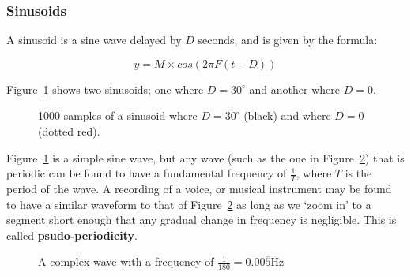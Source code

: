 \subsubsection{Sinusoids}

A sinusoid is a sine wave delayed by $D$ seconds, and is given by the formula:

\[
  y = M \times cos(2\pi F (t - D))
\]

Figure~\ref{fig-sinusoid} shows two sinusoids; one where $D = 30^{\circ}$ and
another where $D = 0$.

\begin{figure}
  \centering
  \label{fig-sinusoid}
  \caption{1000 samples of a sinusoid where $D = 30^{\circ}$ (black) and where
  $D = 0$ (dotted red).}
\end{figure} 

Figure~\ref{fig-sinusoid} is a simple sine wave, but any wave (such as the one
in Figure~\ref{fig-complex-wave}) that is periodic can be found to have a
fundamental frequency of $\frac{1}{T}$, where $T$ is the period of the wave. A
recording of a voice, or musical instrument may be found to have a similar
waveform to that of Figure~\ref{fig-complex-wave} as long as we `zoom in' to a
segment short enough that any gradual change in frequency is negligible. This is
called \textbf{psudo-periodicity}.

\begin{figure}
  \centering
  \label{fig-complex-wave}
  \caption{A complex wave with a frequency of
  $\frac{1}{180} = 0.00\overline{5}\si{\hertz}$}
\end{figure} 

